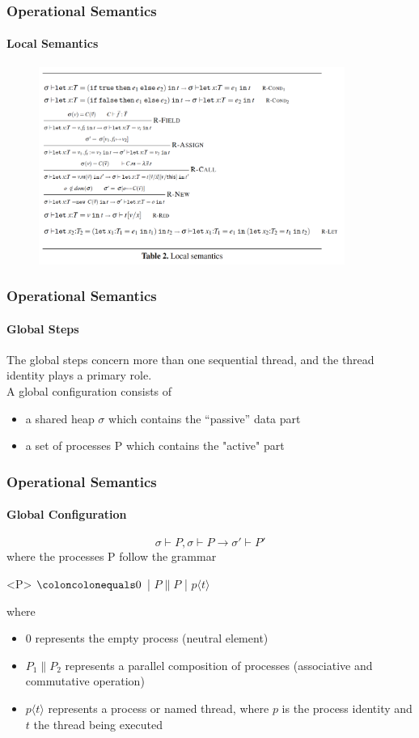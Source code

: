 \begin{frame}
\frametitle{Operational Semantics}
\framesubtitle{Local Semantics}
\begin{figure}[h]
    \includegraphics[width=10cm]{figures/local.png}
    \label{fig::local::semantics}
\end{figure}
\end{frame}

\begin{frame}
\frametitle{Operational Semantics}
\framesubtitle{Global Steps}
The global steps concern more than one sequential thread, and the thread identity plays a primary role. 
\newline \\
A global configuration consists of 
\begin{itemize}
    \item a shared heap $\sigma$ which contains the “passive” data part
    \item a set of processes P which contains the "active" part
\end{itemize}
\end{frame}


\begin{frame}
\frametitle{Operational Semantics}
\framesubtitle{Global Configuration}
\begin{equation}
    \tag{Global Configuration \& Step}
    \sigma \vdash P, \sigma \vdash P \longrightarrow \sigma' \vdash P' 
\end{equation}
where the processes P follow the grammar
\begin{center}
\begin{minipage}{0.8\linewidth}
\begin{grammar}
<P> $\coloncolonequals 0$ | $P \| P$ 
    | $p\langle t \rangle$
\end{grammar}
\end{minipage}
\end{center}
where
\begin{itemize}
    \item $0$ represents the empty process (neutral element)
    \item $P_1 \| P_2$ represents a parallel composition of processes (associative and commutative operation)
    \item $p\langle t \rangle$ represents a process or named thread, where $p$ is the process identity and $t$ the thread being executed
\end{itemize}
\end{frame}



